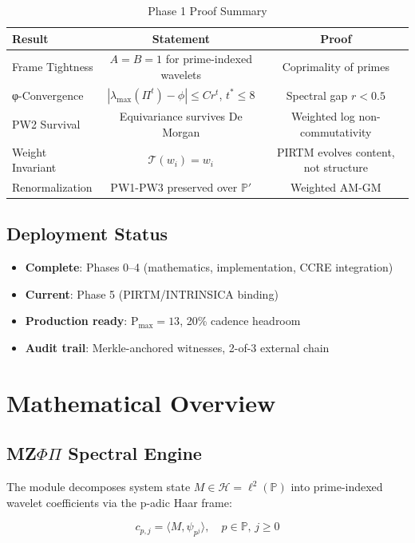\documentclass[11pt]{article}
\begin{document}
\begin{table}[h]
\centering
\begin{tabular}{@{}lcc@{}}
\toprule
Result & Statement & Proof \\
\midrule
Frame Tightness & $A=B=1$ for prime-indexed wavelets & Coprimality of primes \\
φ-Convergence & $|\lambda_{\max}(\Pi^t)-\phi| \le Cr^t$, $t^*\le8$ & Spectral gap $r<0.5$ \\
PW2 Survival & Equivariance survives De Morgan & Weighted log non-commutativity \\
Weight Invariant & $\mathcal{T}(w_i)=w_i$ & PIRTM evolves content, not structure \\
Renormalization & PW1-PW3 preserved over $\mathbb{P}'$ & Weighted AM-GM \\
\bottomrule
\end{tabular}
\caption{Phase 1 Proof Summary}
\end{table}

\subsection{Deployment Status}

\begin{itemize}
\item \textbf{Complete}: Phases 0–4 (mathematics, implementation, CCRE integration)
\item \textbf{Current}: Phase 5 (PIRTM/INTRINSICA binding)
\item \textbf{Production ready}: P$_{\max}=13$, 20\% cadence headroom
\item \textbf{Audit trail}: Merkle-anchored witnesses, 2-of-3 external chain
\end{itemize}

\section{Mathematical Overview}

\subsection{MZ$\Phi\Pi$ Spectral Engine}

The module decomposes system state $M \in \mathcal{H} = \ell^2(\mathbb{P})$ into prime-indexed wavelet coefficients via the p-adic Haar frame:

\[
c_{p,j} = \langle M, \psi_{p^j} \rangle, \quad p \in \mathbb{P}, \, j \ge 0
\]
\end{document}
